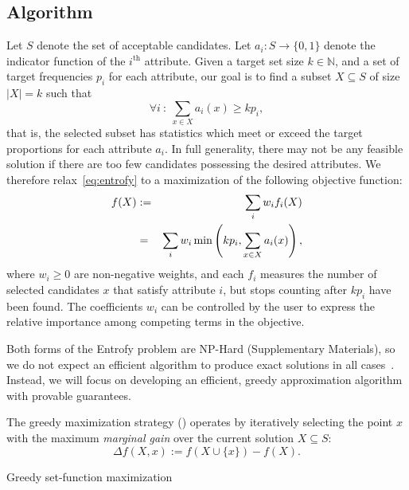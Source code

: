 \documentclass[12pt]{article}
\DeclareMathOperator*{\argmax}{argmax}
\begin{document}
\subsection*{Algorithm}

Let $S$ denote the set of acceptable candidates.
Let ${a_i : S \rightarrow \{0, 1\}}$ denote the indicator function of the $i^\text{th}$ attribute.
Given a target set size $k \in \mathbb{N}$, and a set of target frequencies $p_i$ for each attribute, our
goal is to find a subset $X \subseteq S$ of size $|X|=k$ such that
\begin{equation}
    \forall i~:~\sum_{x \in X} a_i(x) \geq k p_i,\label{eq:entrofy}
\end{equation}
that is, the selected subset has statistics which meet or exceed the target proportions for each attribute $a_i$.
In full generality, there may not be any feasible solution if there are too few candidates possessing the desired attributes.
We therefore relax~\eqref{eq:entrofy} to a maximization of the following objective function:
\begin{eqnarray}
    f(X) &:=& \sum_i w_i f_i(X) \label{eq:entrofy-opt}\\
         &=& \sum_i w_i \min\left(k p_i, \sum_{x \in X} a_i(x)\right),\notag
\end{eqnarray}
where $w_i \geq 0$ are non-negative weights, and each $f_i$ measures the number of selected candidates $x$ that satisfy attribute $i$, but stops counting after $kp_i$ have been found.
The coefficients $w_i$ can be controlled by the user to express the relative importance among competing terms in the objective.

Both forms of the Entrofy problem are NP-Hard (Supplementary Materials), so we do not expect an efficient algorithm to produce exact solutions in all cases~\cite{gary1979computers}.
Instead, we will focus on developing an efficient, greedy approximation algorithm with provable guarantees.

The greedy maximization strategy () operates by iteratively selecting the point $x$ with the maximum \emph{marginal gain} over the current solution $X\subseteq S$:
\begin{equation}
    \Delta f(X, x) := f\left(X \cup \{x\}\right) - f(X).
\end{equation}

\begin{algorithm}[H]
\caption{Greedy set-function maximization}\label{alg:maximize}
\begin{algorithmic}[1]
\State{$X \leftarrow X \cup \left\{\displaystyle\argmax_{x \in S \setminus X} \Delta f(X, x) \right\}$}
\EndWhile{}
\EndProcedure{}
\end{algorithmic}
\end{algorithm}
\end{document}
